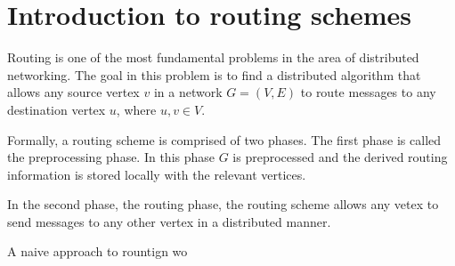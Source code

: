 \chapter{Introduction to routing schemes}
\label{sec:introduction}

Routing is one of the most fundamental problems in the area of distributed
networking. The goal in this problem is to find a distributed algorithm that
allows any source vertex $v$ in a network $G=(V,E)$ to route messages to any
destination vertex $u$, where $u, v\in V$.

Formally, a routing scheme is comprised of two phases. The first phase is
called the preprocessing phase. In this phase $G$ is preprocessed and the
derived routing information is stored locally with the relevant vertices.

In the second phase, the routing phase, the routing scheme allows any vetex to
send messages to any other vertex in a distributed manner.

A naive approach to rountign wo



